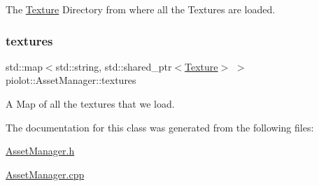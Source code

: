 The \mbox{\hyperlink{classpiolot_1_1_texture}{Texture}} Directory from where all the Textures are loaded. 

\mbox{\label{classpiolot_1_1_asset_manager_a6d9403a544a3efd67e33b52d6bb2a182}} 
\subsubsection{\texorpdfstring{textures}{textures}}
{\footnotesize\ttfamily std\+::map$<$std\+::string, std\+::shared\+\_\+ptr$<$\mbox{\hyperlink{classpiolot_1_1_texture}{Texture}}$>$ $>$ piolot\+::\+Asset\+Manager\+::textures}



A Map of all the textures that we load. 



The documentation for this class was generated from the following files\+:\begin{DoxyCompactItemize}
\item 
\mbox{\hyperlink{_asset_manager_8h}{Asset\+Manager.\+h}}\item 
\mbox{\hyperlink{_asset_manager_8cpp}{Asset\+Manager.\+cpp}}\end{DoxyCompactItemize}
